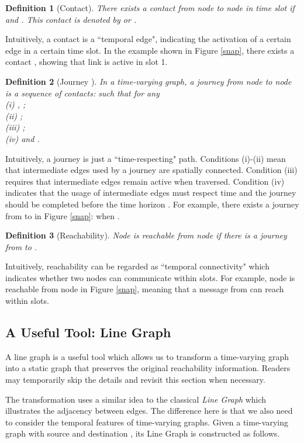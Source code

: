 \documentclass[10pt, conference, letterpaper]{IEEEtran}
\newtheorem{definition}{Definition}
\begin{document}
\begin{definition}[Contact]
There exists a contact from node  to node  in time slot  if  and . This contact is denoted by  or .
\end{definition}

\noindent Intuitively, a contact is a ``temporal edge", indicating the activation of a certain edge in a certain time slot. In the example shown in Figure \ref{snap}, there exists a contact , showing that link  is active in slot 1. 

\begin{definition}[{Journey} \cite{TVG1}]
In a time-varying graph, a journey from node  to node  is a sequence of contacts:
 such that for any \\
(i) , ;\\
(ii)  ; \\
(iii) ;\\ (iv)  and . \end{definition}

\noindent Intuitively, a journey is just a ``time-respecting" path. Conditions (i)-(ii) mean that intermediate edges used by a journey are spatially connected. Condition (iii) requires that intermediate edges remain active when traversed. Condition (iv) indicates that the usage of intermediate edges must respect time and the journey should be completed before the time horizon .  For example, there exists a journey from  to  in Figure \ref{snap}:  when . 

\begin{definition}[{Reachability}]
Node  is reachable from node  if there is a journey from  to .
\end{definition}

\noindent Intuitively, reachability can be regarded as ``temporal connectivity" which indicates whether two nodes can communicate within  slots. For example, node  is reachable from node  in Figure \ref{snap}, meaning that a message from  can reach  within  slots.

\subsection{A Useful Tool: Line Graph}\label{line}
A line graph is a useful tool which allows us to transform a time-varying graph into a static graph that preserves the original reachability information. Readers may temporarily skip the details and revisit this section when necessary.

The transformation uses a similar idea to the classical \emph{Line Graph} \cite{line_ref} which illustrates the adjacency between edges. The difference here is that we also need to consider the temporal features of time-varying graphs.
Given a time-varying graph  with source  and destination , its Line Graph  is constructed as follows.
\end{document}
